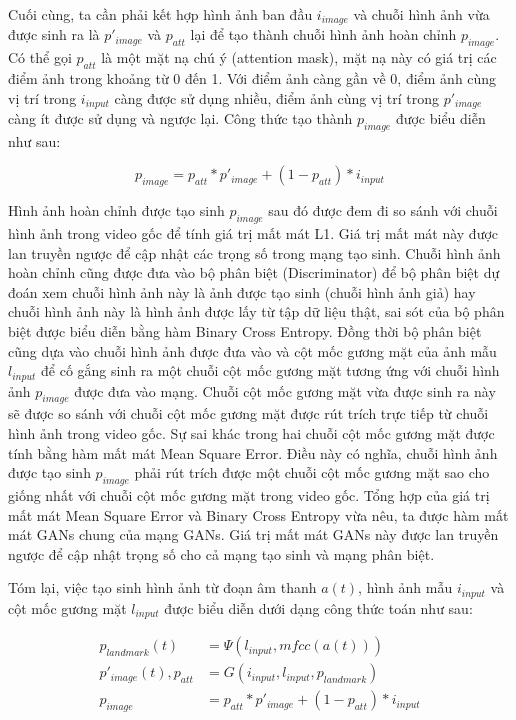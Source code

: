 Cuối cùng, ta cần phải kết hợp hình ảnh ban đầu $i_{image}$ và chuỗi hình ảnh vừa được sinh ra là $p'_{image}$ và $p_{att}$ lại để tạo thành chuỗi hình ảnh hoàn chỉnh $p_{image}$. Có thể gọi $p_{att}$ là một mặt nạ chú ý (attention mask), mặt nạ này có giá trị các điểm ảnh trong khoảng từ 0 đến 1. Với điểm ảnh càng gần về 0, điểm ảnh cùng vị trí trong $i_{input}$ càng được sử dụng nhiều, điểm ảnh cùng vị trí trong $p'_{image}$ càng ít được sử dụng và ngược lại. Công thức tạo thành $p_{image}$ được biểu diễn như sau:

\begin{equation}
    p_{image}=p_{att}*p'_{image}+(1-p_{att})*i_{input}
\end{equation}

Hình ảnh hoàn chỉnh được tạo sinh $p_{image}$ sau đó được đem đi so sánh với chuỗi hình ảnh trong video gốc để tính giá trị mất mát L1. Giá trị mất mát này được lan truyền ngược để cập nhật các trọng số trong mạng tạo sinh. Chuỗi hình ảnh hoàn chỉnh cũng được đưa vào bộ phân biệt (Discriminator) để bộ phân biệt dự đoán xem chuỗi hình ảnh này là ảnh được tạo sinh (chuỗi hình ảnh giả) hay chuỗi hình ảnh này là hình ảnh được lấy từ tập dữ liệu thật, sai sót của bộ phân biệt được biểu diễn bằng hàm Binary Cross Entropy. Đồng thời bộ phân biệt cũng dựa vào chuỗi hình ảnh được đưa vào và cột mốc gương mặt của ảnh mẫu $l_{input}$ để cố gắng sinh ra một chuỗi cột mốc gương mặt tương ứng với chuỗi hình ảnh $p_{image}$ được đưa vào mạng. Chuỗi cột mốc gương mặt vừa được sinh ra này sẽ được so sánh với chuỗi cột mốc gương mặt được rút trích trực tiếp từ chuỗi hình ảnh trong video gốc. Sự sai khác trong hai chuỗi cột mốc gương mặt được tính bằng hàm mất mát Mean Square Error. Điều này có nghĩa, chuỗi hình ảnh được tạo sinh $p_{image}$ phải rút trích được một chuỗi cột mốc gương mặt sao cho giống nhất với chuỗi cột mốc gương mặt trong video gốc. Tổng hợp của giá trị mất mát Mean Square Error và Binary Cross Entropy vừa nêu, ta được hàm mất mát GANs chung của mạng GANs. Giá trị mất mát GANs này được lan truyền ngược để cập nhật trọng số cho cả mạng tạo sinh và mạng phân biệt.

Tóm lại, việc tạo sinh hình ảnh từ đoạn âm thanh $a(t)$, hình ảnh mẫu $i_{input}$ và cột mốc gương mặt $l_{input}$ được biểu diễn dưới dạng công thức toán như sau:

\begin{equation}
    \begin{split}
    p_{landmark}(t) &= \Psi(l_{input}, mfcc(a(t)))\\
    p'_{image}(t), p_{att} &= G(i_{input}, l_{input}, p_{landmark})\\
    p_{image} &= p_{att}*p'_{image}+(1-p_{att})*i_{input}
    \end{split}
\end{equation}

